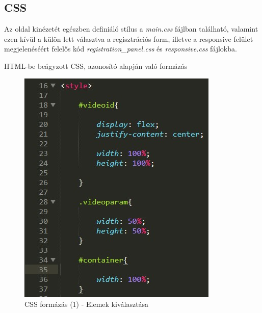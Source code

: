 \documentclass[12pt, titlepage]{article}
\begin{document}
\pagebreak


\subsection{CSS}
Az oldal kinézetét egészben definiáló stílus a \textit{main.css} fájlban található, valamint ezen kívül a külön lett választva a regisztrációs form, illetve a responsive felület megjelenéséért felelős kód \textit{registration\_panel.css} és \textit{responsive.css} fájlokba. 

HTML-be beágyzott CSS, azonosító alapján való formázás

\begin{figure}[!h]
	\centering
	\includegraphics[width=0.8\linewidth]{images/css/1.jpg}
	\caption{CSS formázás (1) - Elemek kiválasztása}
\end{figure}

\pagebreak
\end{document}
